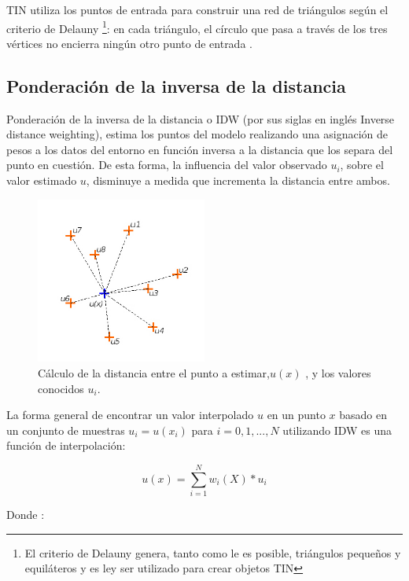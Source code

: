 TIN utiliza los puntos de entrada para construir una red de triángulos según el criterio de Delauny
\footnote{El criterio de Delauny genera, tanto como le es posible, triángulos pequeños y
equiláteros y es ley ser utilizado para crear objetos TIN}: en cada triángulo, el círculo que pasa
a través de los tres vértices no encierra ningún otro punto de entrada \citep{cPachecoMDE2003}.

\subsection{Ponderación de la inversa de la distancia}
Ponderación de la inversa de la distancia o IDW (por sus siglas en inglés Inverse distance
weighting), estima los puntos del modelo realizando una asignación de pesos a los datos del
entorno en función inversa a la distancia que los separa del punto en cuestión. De esta forma,
la influencia del valor observado $u_{i}$, sobre el valor estimado $u$, disminuye a medida que incrementa la distancia entre ambos.


\begin{figure}[H]
\centering
\includegraphics[width=0.5\textwidth]{capitulo-2/graphics/idw-distancia.jpg}
\caption{\label{fig:sig-idw-distancia}Cálculo de la distancia entre el punto a estimar,$u(x)$ , y los valores conocidos $u_{i}$.}

\end{figure}

La forma general de encontrar un valor interpolado $u$ en un punto $x$ basado en un conjunto de
muestras $u_i = u (x_i)$ para $i = 0,1, ..., N$ utilizando IDW es una función de interpolación:

\begin{equation}\label{eq:interpolacion-idw}
 u(x) = \sum_{i=1}^{N} w_i(X) * u_{i}
\end{equation}

Donde :

